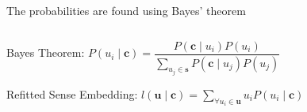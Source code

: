 \documentclass[dvipsnames]{beamer}
\newcommand{\fitcolumn}[1]{
	\begin{column}{0.5\textwidth}
		\begin{adjustbox}{max width=\columnwidth}
			#1
		\end{adjustbox}
	\end{column}%
}
\newcommand{\inputcolumn}[1]{%
	\fitcolumn{}
}
\renewcommand{\c}{\mathbf{c}}
\newcommand{\s}{\mathbf{s}}
\renewcommand{\u}{\mathbf{u}}
\begin{document}
\begin{frame}{The probabilities are found using Bayes' theorem}
	\vspace{-1em}
	\begin{columns}[T]
		\begin{column}{0.5\textwidth}
			
			\vspace{2em}
			Bayes Theorem: 
				$\displaystyle%
				P(u_{i} \mid \c) =
				\dfrac{P(\c \mid u_{i})P(u_{i})}
				{\sum_{u_{j}\in\s} P(\c \mid u_{j})P(u_{j})}
				$
				
			\vspace{2em}
			Refitted Sense Embedding: 
				$\displaystyle%
				l(\u \mid \c ) = \sum_{\forall u_i \in \u} u_i P(u_i \mid \c)
				$

			\vfill
		\end{column}
		
		\inputcolumn{../figs/refitting.tex}
	\end{columns}
	\vspace{0em}
	\sentexample
\end{frame}
\end{document}
